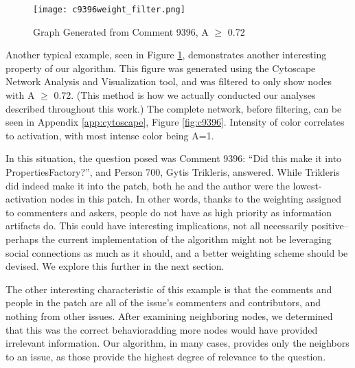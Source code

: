 \begin{figure}[ht]
	\centering
	\texttt{[image: c9396weight\_filter.png]}
	\caption{Graph Generated from Comment 9396, A $\geq$ 0.72}
	\label{fig:cytoscapeFiltered}
\end{figure}

Another typical example, seen in Figure \ref{fig:cytoscapeFiltered}, demonstrates another interesting property of our algorithm. This figure was generated using the Cytoscape ~\cite{cytoscape} Network Analysis and Visualization tool, and was filtered to only show nodes with A $\geq$ 0.72. (This method is how we actually conducted our analyses described throughout this work.) The complete network, before filtering, can be seen in Appendix \ref{app:cytoscape}, Figure \ref{fig:c9396}. Intensity of color correlates to activation, with most intense color being A=1.

In this situation, the question posed was Comment 9396: ``Did this make it into PropertiesFactory?'', and Person 700, Gytis Trikleris, answered. While Trikleris did indeed make it into the patch, both he and the author were the lowest-activation nodes in this patch. In other words, thanks to the weighting assigned to commenters and askers, people do not have as high priority as information artifacts do. This could have interesting implications, not all necessarily positive--perhaps the current implementation of the algorithm might not be leveraging social connections as much as it should, and a better weighting scheme should be devised. We explore this further in the next section. 

The other interesting characteristic of this example is that the comments and people in the patch are all of the issue's commenters and contributors, and nothing from other issues. After examining neighboring nodes, we determined that this was the correct behavior\textemdash adding more nodes would have provided irrelevant information. Our algorithm, in many cases, provides only the neighbors to an issue, as those provide the highest degree of relevance to the question.